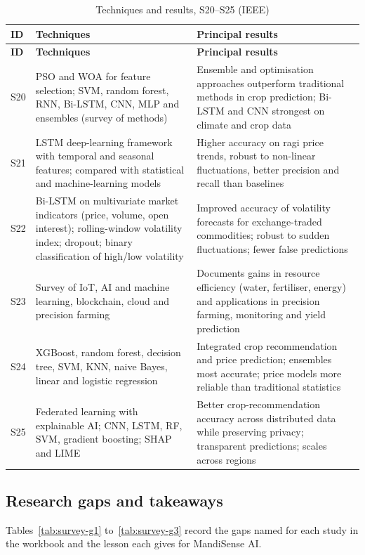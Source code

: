 {\footnotesize\setlength{\tabcolsep}{4pt}\renewcommand{\arraystretch}{1.15}
\begin{longtable}{|p{0.9cm}|p{5.8cm}|p{9.2cm}|}
\caption{Techniques and results, S20--S25 (IEEE)}\label{tab:survey-t3}\\
\hline \textbf{ID} & \textbf{Techniques} & \textbf{Principal results} \\ \hline \endfirsthead
\hline \textbf{ID} & \textbf{Techniques} & \textbf{Principal results} \\ \hline \endhead
\hline \endfoot
S20 & PSO and WOA for feature selection; SVM, random forest, RNN, Bi-LSTM, CNN, MLP and ensembles (survey of methods) & Ensemble and optimisation approaches outperform traditional methods in crop prediction; Bi-LSTM and CNN strongest on climate and crop data \\ \hline
S21 & LSTM deep-learning framework with temporal and seasonal features; compared with statistical and machine-learning models & Higher accuracy on ragi price trends, robust to non-linear fluctuations, better precision and recall than baselines \\ \hline
S22 & Bi-LSTM on multivariate market indicators (price, volume, open interest); rolling-window volatility index; dropout; binary classification of high/low volatility & Improved accuracy of volatility forecasts for exchange-traded commodities; robust to sudden fluctuations; fewer false predictions \\ \hline
S23 & Survey of IoT, AI and machine learning, blockchain, cloud and precision farming & Documents gains in resource efficiency (water, fertiliser, energy) and applications in precision farming, monitoring and yield prediction \\ \hline
S24 & XGBoost, random forest, decision tree, SVM, KNN, naive Bayes, linear and logistic regression & Integrated crop recommendation and price prediction; ensembles most accurate; price models more reliable than traditional statistics \\ \hline
S25 & Federated learning with explainable AI; CNN, LSTM, RF, SVM, gradient boosting; SHAP and LIME & Better crop-recommendation accuracy across distributed data while preserving privacy; transparent predictions; scales across regions \\ \hline
\end{longtable}}

\subsection{Research gaps and takeaways}
Tables~\ref{tab:survey-g1} to~\ref{tab:survey-g3} record the gaps named for each study in the workbook and the lesson each gives for MandiSense AI.

